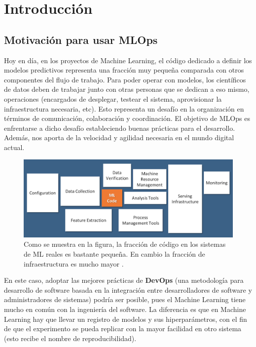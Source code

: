 \chapter{Introducción}

\section{Motivación para usar MLOps}

Hoy en día, en los proyectos de Machine Learning, el código dedicado a definir los modelos predictivos representa una fracción muy pequeña comparada con otros componentes del flujo de trabajo. Para poder operar con modelos, los científicos de datos deben de trabajar junto con otras personas que se dedican a eso mismo, operaciones (encargados de desplegar, testear el sistema, aprovisionar la infraestructura necesaria, etc). Esto representa un desafío en la organización en términos de comunicación, colaboración y coordinación. El objetivo de MLOps es enfrentarse a dicho desafío estableciendo buenas prácticas para el desarrollo. Además, nos aporta de la velocidad y agilidad necesaria en el mundo digital actual.

\begin{figure}[h]
	\includegraphics[scale=1]{imagenes/01_Introduccion/mlcodefraction.jpg}
	\centering
	\caption{Como se muestra en la figura, la fracción de código en los sistemas de ML reales es bastante pequeña. En cambio la fracción de infraestructura es mucho mayor \cite{NIPS2015_86df7dcf}.}
\end{figure}

En este caso, adoptar las mejores prácticas de \textbf{DevOps} (una metodología para desarrollo de software basada en la integración entre desarrolladores de software y administradores de sistemas) podría ser posible, pues el Machine Learning tiene mucho en común con la ingeniería del software. La diferencia es que en Machine Learning hay que llevar un registro de modelos y sus hiperparámetros, con el fin de que el experimento se pueda replicar con la mayor facilidad en otro sistema (esto recibe el nombre de reproducibilidad).\newline

